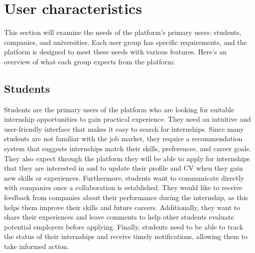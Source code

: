 \section{User characteristics}\label{subsec:user_characteristics}
This section will examine the needs of the platform's primary users: students, companies, and universities. 
Each user group has specific requirements, and the platform is designed to meet these needs with various features. 
Here’s an overview of what each group expects from the platform:

\subsection{Students}
Students are the primary users of the platform who are looking for suitable internship opportunities to gain practical experience. They need an intuitive and 
user-friendly interface that makes it easy to search for internships. Since many students are not familiar with the job market, they require a recommendation 
system that suggests internships match their skills, preferences, and career goals. They also expect through the platform they will be able to apply for internships
that they are interested in and to update their profile and CV when they gain new skills or experiences.
Furthermore, students want to communicate directly with companies once a collaboration is established. They would like to receive feedback from companies about 
their performance during the internship, as this helps them improve their skills and future careers. Additionally, they want to share their experiences and 
leave comments to help other students evaluate potential employers before applying.
Finally, students need to be able to track the status of their internships and receive timely notifications, allowing them to take informed action.


